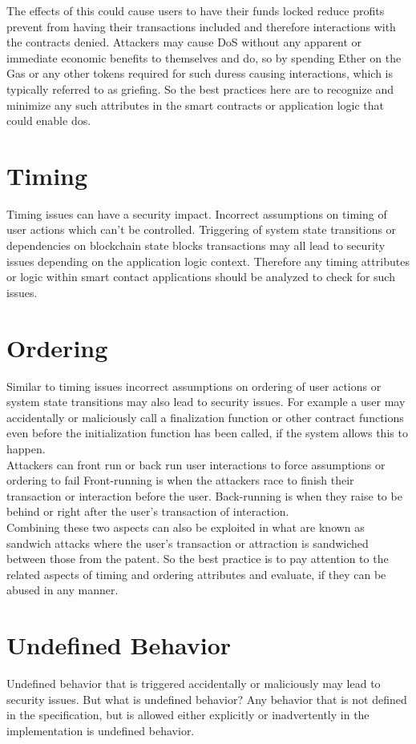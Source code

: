 The effects of this could cause users to have their funds locked reduce profits prevent from having their transactions included and therefore interactions with the contracts denied. Attackers may cause DoS without any apparent or immediate economic benefits to themselves and do, so by spending Ether on the Gas or any other tokens required for such duress causing interactions, which is typically referred to as griefing. So the best practices here are to recognize and minimize any such attributes in the smart contracts or application logic that could enable dos.

\section{Timing}
Timing issues can have a security impact. Incorrect assumptions on timing of user actions which can't be controlled. Triggering of system state transitions or dependencies on blockchain state blocks transactions may all lead to security issues depending on the application logic context. Therefore any timing attributes or logic within smart contact applications should be analyzed to check for such issues.

\section{Ordering}
Similar to timing issues incorrect assumptions on ordering of user actions or system state transitions may also lead to security issues. For example a user may accidentally or maliciously call a finalization function or other contract functions even before the initialization function has been called, if the system allows this to happen.\\

Attackers can front run or back run user interactions to force assumptions or ordering to fail Front-running is when the attackers race to finish their transaction or interaction before the user. Back-running is when they raise to be behind or right after the user's transaction of interaction.\\

Combining these two aspects can also be exploited in what are known as sandwich attacks where the user's transaction or attraction is sandwiched between those from the patent. So the best practice is to pay attention to the related aspects of timing and ordering attributes and evaluate, if they can be abused in any manner.

\section{Undefined Behavior}
Undefined behavior that is triggered accidentally or maliciously may lead to security issues. But what is undefined behavior? Any behavior that is not defined in the specification, but is allowed either explicitly or inadvertently in the implementation is undefined behavior.\\

